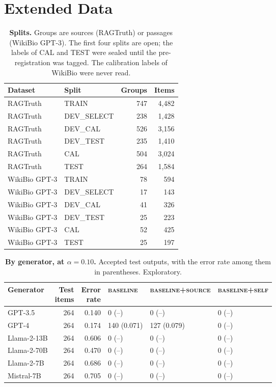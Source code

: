 \documentclass[11pt]{article}
\newcommand{\arm}[1]{\textsc{#1}}
\begin{document}
\clearpage
\section*{Extended Data}
\setcounter{table}{0}
\renewcommand{\tablename}{Extended Data Table}

\begin{table}[h]
\centering
\small
\caption{\textbf{Splits.} Groups are sources (RAGTruth) or passages (WikiBio GPT-3). The first four splits are open; the labels of CAL and TEST were sealed until the pre-registration was tagged. The calibration labels of WikiBio were never read.}
\label{tab:splits}
\begin{tabular}{@{}llrr@{}}
\toprule
Dataset & Split & Groups & Items \\
\midrule
RAGTruth & TRAIN & 747 & 4,482 \\
RAGTruth & DEV\_SELECT & 238 & 1,428 \\
RAGTruth & DEV\_CAL & 526 & 3,156 \\
RAGTruth & DEV\_TEST & 235 & 1,410 \\
RAGTruth & CAL & 504 & 3,024 \\
RAGTruth & TEST & 264 & 1,584 \\
WikiBio GPT-3 & TRAIN & 78 & 594 \\
WikiBio GPT-3 & DEV\_SELECT & 17 & 143 \\
WikiBio GPT-3 & DEV\_CAL & 41 & 326 \\
WikiBio GPT-3 & DEV\_TEST & 25 & 223 \\
WikiBio GPT-3 & CAL & 52 & 425 \\
WikiBio GPT-3 & TEST & 25 & 197 \\
\bottomrule
\end{tabular}
\end{table}

\begin{table}[h]
\centering
\small
\caption{\textbf{By generator, at $\alpha = 0.10$.} Accepted test outputs, with the error rate among them in parentheses. Exploratory.}
\label{tab:generators}
\begin{tabular}{@{}lrrlll@{}}
\toprule
Generator & \shortstack[r]{Test\\items} & \shortstack[r]{Error\\rate} & \arm{baseline} & \arm{baseline+source} & \arm{baseline+self} \\
\midrule
GPT-3.5 & 264 & 0.140 & 0 (--) & 0 (--) & 0 (--) \\
GPT-4 & 264 & 0.174 & 140 (0.071) & 127 (0.079) & 0 (--) \\
Llama-2-13B & 264 & 0.606 & 0 (--) & 0 (--) & 0 (--) \\
Llama-2-70B & 264 & 0.470 & 0 (--) & 0 (--) & 0 (--) \\
Llama-2-7B & 264 & 0.686 & 0 (--) & 0 (--) & 0 (--) \\
Mistral-7B & 264 & 0.705 & 0 (--) & 0 (--) & 0 (--) \\
\bottomrule
\end{tabular}
\end{table}
\end{document}
